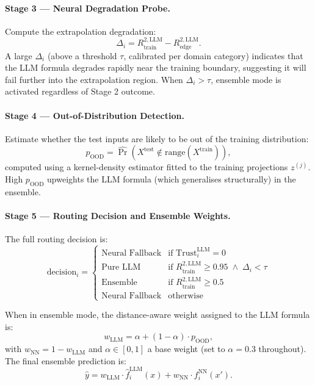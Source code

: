 \documentclass[twoside,11pt]{article}
\newcommand{\wLLM}{w_{\mathrm{LLM}}}
\newcommand{\wNN}{w_{\mathrm{NN}}}
\begin{document}
\paragraph{Stage 3 --- Neural Degradation Probe.}
Compute the extrapolation degradation:
\begin{equation}
  \Delta_i = {R^{2,\mathrm{LLM}}_{\mathrm{train}}} - {R^{2,\mathrm{LLM}}_{\mathrm{edge}}}.
  \label{eq:degradation}
\end{equation}
A large $\Delta_i$ (above a threshold $\tau$, calibrated per domain category)
indicates that the LLM formula degrades rapidly near the training boundary,
suggesting it will fail further into the extrapolation region.  When $\Delta_i > \tau$,
ensemble mode is activated regardless of Stage 2 outcome.

\paragraph{Stage 4 --- Out-of-Distribution Detection.}
Estimate whether the test inputs are likely to be out of the training distribution:
\begin{equation}
  p_{\mathrm{OOD}} = \hat{\Pr}\!\left(X^{\mathrm{test}} \notin \mathrm{range}(X^{\mathrm{train}})\right),
  \label{eq:ood}
\end{equation}
computed using a kernel-density estimator fitted to the training projections $z^{(j)}$.
High $p_{\mathrm{OOD}}$ upweights the LLM formula (which generalises structurally) in
the ensemble.

\paragraph{Stage 5 --- Routing Decision and Ensemble Weights.}
The full routing decision is:
\begin{equation}
  \mathrm{decision}_i = \begin{cases}
    \text{Neural Fallback} & \text{if Trust}_i^{\mathrm{LLM}} = 0 \\
    \text{Pure LLM}        & \text{if } {R^{2,\mathrm{LLM}}_{\mathrm{train}}} \ge 0.95 \;\land\; \Delta_i < \tau \\
    \text{Ensemble}        & \text{if } {R^{2,\mathrm{LLM}}_{\mathrm{train}}} \ge 0.5 \\
    \text{Neural Fallback} & \text{otherwise}
  \end{cases}
  \label{eq:routing}
\end{equation}

When in ensemble mode, the distance-aware weight assigned to the LLM formula is:
\begin{equation}
  \wLLM = \alpha + (1 - \alpha)\cdot p_{\mathrm{OOD}},
  \label{eq:wllm}
\end{equation}
with $\wNN = 1 - \wLLM$ and $\alpha \in [0,1]$ a base weight (set to $\alpha=0.3$
throughout).  The final ensemble prediction is:
\begin{equation}
  \hat{y} = \wLLM \cdot \hat{f}^{\mathrm{LLM}}_i(x) + \wNN \cdot f^{\mathrm{NN}}_i(x').
  \label{eq:ensemble}
\end{equation}
\end{document}
